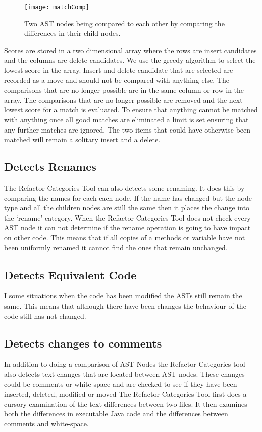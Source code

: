 \begin{figure}[!t]
 \begin{center}
 \texttt{[image: matchComp]}
 \end{center}
 \caption{Two AST nodes being compared to each other by comparing the differences in their child nodes.}
 \label{fig:matchComp}
\end{figure}

Scores are stored in a two dimensional array where the rows are insert candidates and the columns are delete candidates.  We use the greedy algorithm to select the lowest score in the array.  Insert and delete candidate that are selected are recorded as a move and should not be compared with anything else. The comparisons that are no longer possible are in the same column or row in the array.  The comparisons that are no longer possible are removed and the next lowest score for a match is evaluated.  To ensure that anything cannot be matched with anything once all good matches are eliminated a limit is set ensuring that any further matches are ignored.  The two items that could have otherwise been matched will remain a solitary insert and a delete.

\subsection{Detects Renames}
The Refactor Categories Tool can also detects some renaming. 
It does this by comparing the names for each each node.
If the name has changed but the node type and all the children nodes are still the same then it places the change into the `rename' category.
When the Refactor Categories Tool does not check every AST node it can not determine if the rename operation is going to have impact on other code.
This means that if all copies of a methods or variable have not been uniformly renamed it cannot find the ones that remain unchanged.

\subsection{Detects Equivalent Code}
I some situations when the code has been modified the ASTs still remain the same.  
This means that although there have been changes the behaviour of the code still has not changed.

\subsection{Detects changes to comments} 
In addition to doing a comparison of AST Nodes the Refactor Categories tool also detects text changes that are located between AST nodes.
These changes could be comments or white space and are checked to see if they have been inserted, deleted, modified or moved
The Refactor Categories Tool first does a cursory examination of the text differences between two files.
It then examines both the differences in executable Java code and the differences between comments and white-space. 

